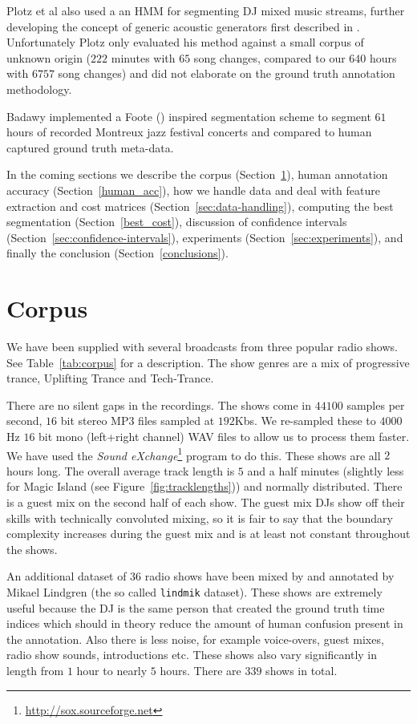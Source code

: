 \documentclass[twocolumn]{article}
\begin{document}
	Plotz et al also used a an HMM for segmenting DJ mixed music streams, further developing the concept of generic acoustic generators first described in \citep{batlle2002automatic}. Unfortunately Plotz only evaluated his method against a small corpus of unknown origin ($222$ minutes with $65$ song changes, compared to our $640$ hours with $6757$ song changes) and did not elaborate on the ground truth annotation methodology. 
	
	Badawy implemented a Foote (\citep{foote2003media}) inspired segmentation scheme to segment $61$ hours of recorded Montreux jazz festival concerts and compared to human captured ground truth meta-data. 
	
	In the coming sections we describe the corpus (Section~\ref{dataset}), human annotation accuracy (Section~\ref{human_acc}), how we handle data and deal with feature extraction and cost matrices (Section~\ref{sec:data-handling}), computing the best segmentation (Section~\ref{best_cost}), discussion of confidence intervals (Section~\ref{sec:confidence-intervals}), experiments (Section~\ref{sec:experiments}), and finally the conclusion (Section~\ref{conclusions}).
	
	\section{Corpus}\label{dataset}
	
	We have been supplied with several broadcasts from three popular radio shows. See Table~\ref{tab:corpus} for a description. The show genres are a mix of progressive trance, Uplifting Trance and Tech-Trance. 
	
	There are no silent gaps in the recordings. The shows come in $44100$ samples per second, $16$ bit stereo MP3 files sampled at $192$Kbs. We re-sampled these to $4000$Hz $16$ bit mono (left+right channel) WAV files to allow us to process them faster. We have used the \textit{Sound eXchange}\footnote{\url{http://sox.sourceforge.net}} program to do this. These shows are all $2$ hours long. The overall average track length is $5$ and a half minutes (slightly less for Magic Island (see Figure~\ref{fig:tracklengths})) and normally distributed.  There is a guest mix on the second half of each show. The guest mix DJs show off their skills with technically convoluted mixing, so it is fair to say that the boundary complexity increases during the guest mix and is at least not constant throughout the shows.
	
	An additional dataset of $36$ radio shows have been mixed by and annotated by Mikael Lindgren (the so called \texttt{lindmik} dataset). These shows are extremely useful because the DJ is the same person that created the ground truth time indices which should in theory reduce the amount of human confusion present in the annotation. Also there is less noise, for example voice-overs, guest mixes, radio show sounds, introductions etc. These shows also vary significantly in length from $1$ hour to nearly $5$ hours. There are $339$ shows in total.
	
\end{document}
